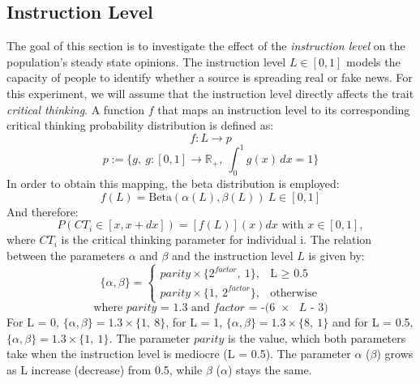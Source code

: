 \subsection{Instruction Level}
\label{sec:Instr_Level}
The goal of this section is to investigate the effect of the \emph{instruction level} on the population's steady state opinions. The instruction level $L \in [0,1]$ models the capacity of people to identify whether a source is spreading real or fake news. For this experiment, we will assume that the instruction level directly affects the trait \emph{critical thinking}. A function $f$  that maps an instruction level to its corresponding critical thinking probability distribution is defined as:
$$
f: L \to p 
$$
$$
p:= \{g,\ g: [0,1] \to \mathbb{R}_+,\ \int_{0}^{1} g(x) \,dx = 1\}
$$
In order to obtain this mapping, the beta distribution is employed: 
$$
f(L) = \text{Beta}(\alpha(L), \beta(L))\ L \in [0,1]
$$
And therefore:
$$
P(CT_i\in[x,x+dx]) = [f(L)](x) dx \text{ with } x\in [0,1],
$$
where $CT_i$ is the critical thinking parameter for individual i. 
The relation between the parameters $\alpha$ and $\beta$ and the instruction level $L$ is given by: 
$$
\{\alpha, \beta\} = 
\begin{cases}
parity \times \{2^{factor},\ 1\},& \text{L $\geq$ 0.5}\\
parity \times \{1,\ 2^{factor}\},& \text{otherwise}
\end{cases}
$$
$$ 
\text{where }
\text{$parity$ = 1.3 and $factor$ = -(6 $\times$ $L$ - 3)}
$$
For L = 0, $\{\alpha, \beta\} = 1.3\times\{1,\ 8\}$, for L = 1, $\{\alpha, \beta\} = 1.3\times\{8,\ 1\}$ and for L = 0.5, $\{\alpha, \beta\} = 1.3\times\{1,\ 1\}$. The parameter $parity$ is the value, which both parameters take when the instruction level is mediocre (L = 0.5). The parameter $\alpha$ ($\beta$) grows as L increase (decrease) from 0.5, while $\beta$ ($\alpha$) stays the same. 
